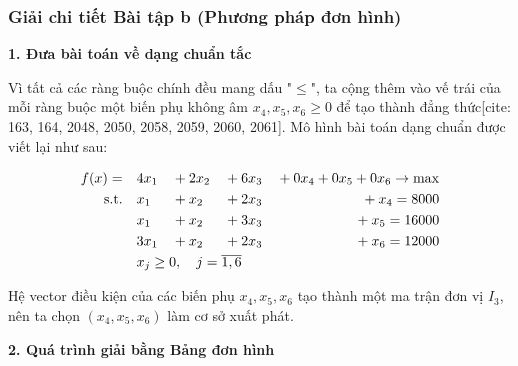 \subsubsection{Giải chi tiết Bài tập b (Phương pháp đơn hình)}

\textbf{1. Đưa bài toán về dạng chuẩn tắc}

Vì tất cả các ràng buộc chính đều mang dấu "$\le$", ta cộng thêm vào vế trái của mỗi ràng buộc một biến phụ không âm $x_4, x_5, x_6 \ge 0$ để tạo thành đẳng thức[cite: 163, 164, 2048, 2050, 2058, 2059, 2060, 2061].
Mô hình bài toán dạng chuẩn được viết lại như sau:

\begin{alignat*}{4}
    f(x) = \quad & 4x_1 & {}+{} & 2x_2 & {}+{} & 6x_3 & {}+{} 0x_4 + 0x_5 + 0x_6 \rightarrow \max \\
    \text{s.t.} \quad & x_1 & {}+{} & x_2 & {}+{} & 2x_3 & {}+{} x_4 = 8000 \\
    & x_1 & {}+{} & x_2 & {}+{} & 3x_3 & {}+{} x_5 = 16000 \\
    & 3x_1 & {}+{} & x_2 & {}+{} & 2x_3 & {}+{} x_6 = 12000 \\
    & \rlap{$x_j \ge 0, \quad j = \overline{1,6}$}
\end{alignat*}

Hệ vector điều kiện của các biến phụ $x_4, x_5, x_6$ tạo thành một ma trận đơn vị $I_3$, nên ta chọn $(x_4, x_5, x_6)$ làm cơ sở xuất phát.

\vspace{0.3cm}
\textbf{2. Quá trình giải bằng Bảng đơn hình}


